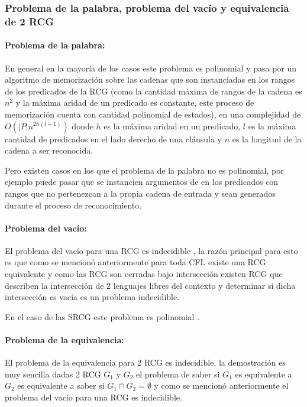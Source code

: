 \documentclass{article}
\begin{document}
\subsubsection{Problema de la palabra, problema del vacío y equivalencia de 2 RCG}

\paragraph{Problema de la palabra:} En general en la mayoría de los casos este problema es polinomial y pasa por
un algoritmo de memorización sobre las cadenas que son instanciadas en los rangos de los predicados de la RCG \cite{mainRCGBib} (como la cantidad
máxima de rangos de la cadena es $n^2$ y la máxima aridad de un predicado es constante, este proceso de memorización cuenta
con cantidad polinomial de estados), en
una complejidad de $O(|P|n^{2h(l+1)})$ donde $h$ es la máxima aridad en un predicado, $l$ es la máxima cantidad de predicados
en el lado derecho de una cláusula y $n$ es la longitud de la cadena a ser reconocida.

Pero existen casos en los que el problema de la palabra no
es polinomial, por ejemplo puede pasar que se instancien argumentos de en los predicados con rangos que no pertenezcan
a la propia cadena de entrada y sean generados durante el proceso de reconocimiento.

\paragraph{Problema del vacío:} El problema del vacío para una RCG es indecidible \cite{propertiesRCGBib}, la razón principal para esto es que como se mencionó anteriormente
para toda CFL existe una RCG equivalente y como las RCG son cerradas bajo intersección existen RCG que describen
la intersección de 2 lenguajes libres del contexto y determinar si dicha intersección es vacía es un problema indecidible.

En el caso de las SRCG este problema es polinomial \cite{mainRCGBib}.

\paragraph{Problema de la equivalencia:} El problema de la equivalencia para 2 RCG es indecidible, la demostración es muy sencilla dadas 2 RCG $G_1$ y $G_2$ el problema
de saber si $G_1$ es equivalente a $G_2$ es equivalente a saber si $G_1\cap \overline{G_2}=\emptyset$ y como se mencionó anteriormente el problema del vacío para una RCG
es indecidible.
\end{document}
